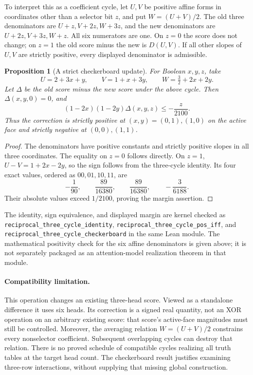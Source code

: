 \documentclass[11pt]{article}
\newtheorem{proposition}{Proposition}
\begin{document}
To interpret this as a coefficient cycle, let $U,V$ be positive affine
forms in coordinates other than a selector bit $z$, and put
$W=(U+V)/2$. The old three denominators are
$U+z,V+2z,W+3z$, and the new denominators are
$U+2z,V+3z,W+z$. All six numerators are one. On $z=0$ the score
does not change; on $z=1$ the old score minus the new is $D(U,V)$.
If all other slopes of $U,V$ are strictly positive, every displayed
denominator is admissible.

\begin{proposition}[A strict checkerboard update]
For Boolean $x,y,z$, take
\[
 U=2+3x+y,\qquad V=1+x+3y,\qquad W=\tfrac32+2x+2y.
\]
Let $\Delta$ be the old score minus the new score under the above
cycle. Then $\Delta(x,y,0)=0$, and
\[
 (1-2x)(1-2y)\Delta(x,y,z)\le-\frac z{2100}.
\]
Thus the correction is strictly positive at $(x,y)=(0,1),(1,0)$
on the active face and strictly negative at $(0,0),(1,1)$.
\end{proposition}
\begin{proof}
The denominators have positive constants and strictly positive slopes
in all three coordinates. The equality on $z=0$ follows directly.
On $z=1$, $U-V=1+2x-2y$, so the sign follows from the three-cycle
identity. Its four exact values, ordered as $00,01,10,11$, are
\[
 -\frac1{90},\qquad\frac{89}{16380},\qquad
 \frac{89}{16380},\qquad-\frac3{6188}.
\]
Their absolute values exceed $1/2100$, proving the margin assertion.
\end{proof}

The identity, sign equivalence, and displayed margin are kernel checked
as \texttt{reciprocal\_three\_cycle\_identity},
\texttt{reciprocal\_three\_cycle\_pos\_iff}, and
\texttt{reciprocal\_three\_cycle\_checkerboard} in the same Lean module.
The mathematical positivity check for the six affine denominators is
given above; it is not separately packaged as an attention-model
realization theorem in that module.

\paragraph{Compatibility limitation.}
This operation changes an existing three-head score. Viewed as a
standalone difference it uses six heads. Its correction is a signed
real quantity, not an XOR operation on an arbitrary existing score:
that score's active-face magnitudes must still be controlled. Moreover,
the averaging relation $W=(U+V)/2$ constrains every nonselector
coefficient. Subsequent overlapping cycles can destroy that relation.
There is no proved schedule of compatible cycles realizing all truth
tables at the target head count. The checkerboard result justifies
examining three-row interactions, without supplying that missing
global construction.
\end{document}
